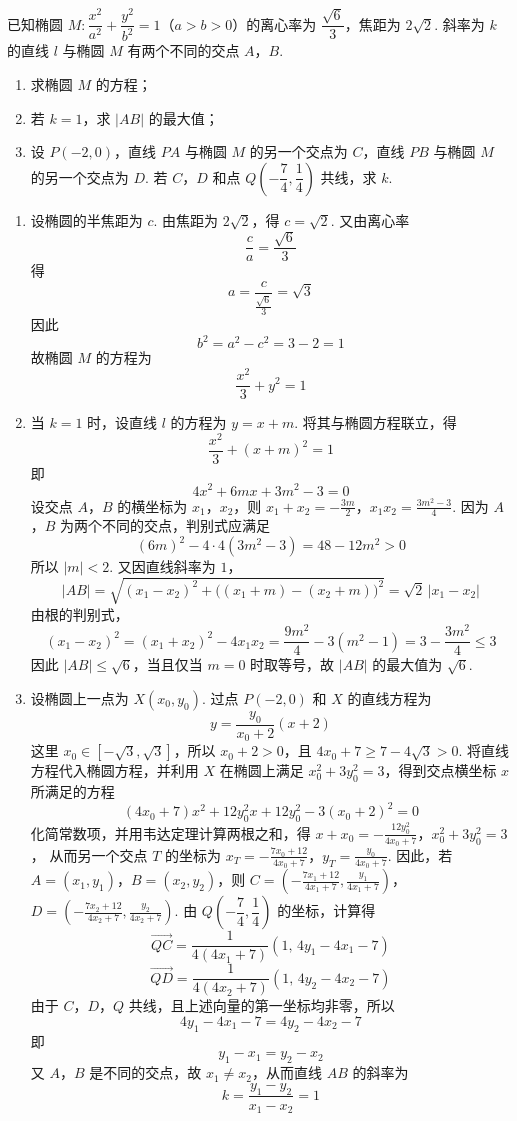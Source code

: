 \begin{problem}

已知椭圆 \(M:\dfrac{x^2}{a^2}+\dfrac{y^2}{b^2}=1\)（\(a>b>0\)）的离心率为 \(\dfrac{\sqrt6}{3}\)，焦距为 \(2\sqrt2\). 斜率为 \(k\) 的直线 \(l\) 与椭圆 \(M\) 有两个不同的交点 \(A\)，\(B\).

\begin{enumerate}
\item 求椭圆 \(M\) 的方程；
\item 若 \(k=1\)，求 \(\lvert AB\rvert\) 的最大值；
\item 设 \(P(-2,0)\)，直线 \(PA\) 与椭圆 \(M\) 的另一个交点为 \(C\)，直线 \(PB\) 与椭圆 \(M\) 的另一个交点为 \(D\). 若 \(C\)，\(D\) 和点 \(Q\left(-\dfrac74,\dfrac14\right)\) 共线，求 \(k\).
\end{enumerate}
\end{problem}

\begin{solution}
\begin{enumerate}
\item 设椭圆的半焦距为 \(c\). 由焦距为 \(2\sqrt2\)，得 \(c=\sqrt2\). 又由离心率
\[
\frac ca=\frac{\sqrt6}{3}
\]
得
\[
a=\frac{c}{\frac{\sqrt6}{3}}=\sqrt3
\]
因此
\[
b^2=a^2-c^2=3-2=1
\]
故椭圆 \(M\) 的方程为
\[
\frac{x^2}{3}+y^2=1
\]

\item 当 \(k=1\) 时，设直线 \(l\) 的方程为 \(y=x+m\). 将其与椭圆方程联立，得
\[
\frac{x^2}{3}+(x+m)^2=1
\]
即
\[
4x^2+6mx+3m^2-3=0
\]
设交点 \(A\)，\(B\) 的横坐标为 \(x_1\)，\(x_2\)，则
\(x_1+x_2=-\frac{3m}{2}\)，\(x_1x_2=\frac{3m^2-3}{4}\).
因为 \(A\)，\(B\) 为两个不同的交点，判别式应满足
\[
(6m)^2-4\cdot4(3m^2-3)=48-12m^2>0
\]
所以 \(|m|<2\). 又因直线斜率为 \(1\)，
\[
|AB|=\sqrt{(x_1-x_2)^2+\bigl((x_1+m)-(x_2+m)\bigr)^2}=\sqrt2\,|x_1-x_2|
\]
由根的判别式，
\[
(x_1-x_2)^2=(x_1+x_2)^2-4x_1x_2
=\frac{9m^2}{4}-3(m^2-1)=3-\frac{3m^2}{4}\leq3
\]
因此 \(|AB|\leq\sqrt6\)，当且仅当 \(m=0\) 时取等号，故 \(|AB|\) 的最大值为 \(\sqrt6\).

\item 设椭圆上一点为 \(X(x_0,y_0)\). 过点 \(P(-2,0)\) 和 \(X\) 的直线方程为
\[
y=\frac{y_0}{x_0+2}(x+2)
\]
这里 \(x_0\in[-\sqrt3,\sqrt3]\)，所以 \(x_0+2>0\)，且 \(4x_0+7\geq7-4\sqrt3>0\). 将直线方程代入椭圆方程，并利用 \(X\) 在椭圆上满足 \(x_0^2+3y_0^2=3\)，得到交点横坐标 \(x\) 所满足的方程
\[
(4x_0+7)x^2+12y_0^2x+12y_0^2-3(x_0+2)^2=0
\]
化简常数项，并用韦达定理计算两根之和，得
\(x+x_0=-\frac{12y_0^2}{4x_0+7}\)，\(x_0^2+3y_0^2=3\)，
从而另一个交点 \(T\) 的坐标为
\(x_T=-\frac{7x_0+12}{4x_0+7}\)，\(y_T=\frac{y_0}{4x_0+7}\).
因此，若 \(A=(x_1,y_1)\)，\(B=(x_2,y_2)\)，则
\(C=\left(-\frac{7x_1+12}{4x_1+7},\frac{y_1}{4x_1+7}\right)\)，\(D=\left(-\frac{7x_2+12}{4x_2+7},\frac{y_2}{4x_2+7}\right)\).
由 \(Q\left(-\dfrac74,\dfrac14\right)\) 的坐标，计算得
\[
\overrightarrow{QC}=\frac1{4(4x_1+7)}(1,\,4y_1-4x_1-7)
\]
\[
\overrightarrow{QD}=\frac1{4(4x_2+7)}(1,\,4y_2-4x_2-7)
\]
由于 \(C\)，\(D\)，\(Q\) 共线，且上述向量的第一坐标均非零，所以
\[
4y_1-4x_1-7=4y_2-4x_2-7
\]
即
\[
y_1-x_1=y_2-x_2
\]
又 \(A\)，\(B\) 是不同的交点，故 \(x_1\ne x_2\)，从而直线 \(AB\) 的斜率为
\[
k=\frac{y_1-y_2}{x_1-x_2}=1
\]
\end{enumerate}
\end{solution}
